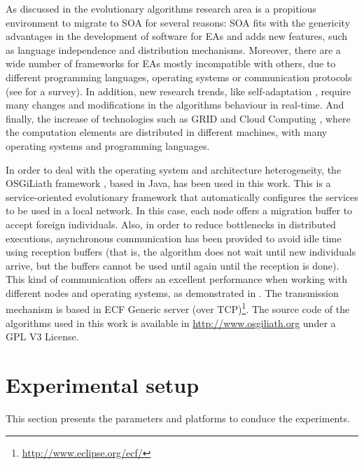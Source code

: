 \documentclass[final,1p,times]{elsarticle}
\begin{document}
As discussed in \cite{SOASOCO} the evolutionary algorithms research area is a propitious environment to migrate to SOA for several reasons: SOA fits with the genericity advantages in the development of software for EAs \cite{GENERICITY05} and adds new features, such as language independence and  distribution mechanisms. Moreover, there are a wide number of frameworks for EAs mostly incompatible with others, due to different programming languages, operating systems or communication protocols (see \cite{SURVEYMOFS} for a survey). In addition, new research trends, like self-adaptation \cite{SELFSTAR}, require many changes and modifications in the algorithms behaviour in real-time. And finally, the increase of technologies such as GRID and Cloud Computing \cite{CLOUD,LOADBALANCINGCLOUD}, where the computation elements are distributed in different machines, with many operating systems and programming languages.

In order to deal with the operating system and architecture
heterogeneity, the OSGiLiath framework \cite{SOASOCO}, based in Java,
has been used in this work. This is a service-oriented evolutionary
framework that automatically configures the services to be used in a
local network. In this case, each node offers a migration buffer to
accept foreign individuals. Also, in order to reduce bottlenecks in
distributed executions, asynchronous communication has been provided
to avoid idle time using reception buffers (that is, the algorithm
does not wait until new individuals arrive, but the buffers cannot be
used until again until the reception is done). This kind of
communication offers an excellent performance when working with
different nodes and operating systems, as demonstrated in
\cite{HETEROGENEOUSHARD}. The transmission mechanism is based in ECF
Generic server (over
TCP)\footnote{\url{http://www.eclipse.org/ecf/}}. 
The source code of
the algorithms used in this work is available in
\url{http://www.osgiliath.org} under a GPL V3 License. 


\section{Experimental setup}
\label{sec:experiments}
This section presents the parameters and platforms to conduce the experiments. 
\end{document}
